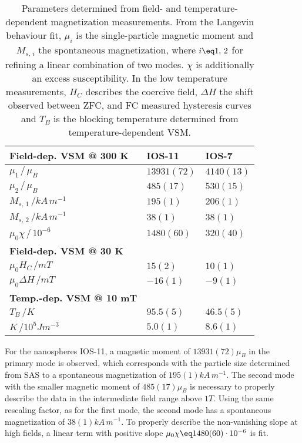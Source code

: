 \documentclass[\main/dresen_thesis.tex]{subfiles}
\begin{document}
  \begin{table}[!htbp]
    \centering
    \caption{\label{tab:looselyPackedNP:nanoparticle:vsm} Parameters determined from field- and temperature-dependent magnetization measurements. From the Langevin behaviour fit, $\mu_i$ is the single-particle magnetic moment and $M_{s,\,i}$ the spontaneous magnetization, where $i\eq 1,\,2$ for refining a linear combination of two modes. $\chi$ is additionally an excess susceptibility. In the low temperature measurements, $H_C$ describes the coercive field, $\Delta H$ the shift observed between ZFC, and FC measured hysteresis curves and $T_B$ is the blocking temperature determined from temperature-dependent VSM.}
    \begin{tabular}{ l | l | l }
      \rule{0pt}{2ex} \textbf{Field-dep. VSM @ 300 K} & IOS-11 & IOS-7 \\
      \hline
      \rule{0pt}{2ex} $\mu_1 \, / \, \mu_B$                     & $13931(72)$    & $4140(13)$\\
      \rule{0pt}{2ex} $\mu_2 \, / \, \mu_B$                     & $485(17) $     & $530(15)$\\
      \rule{0pt}{2ex} $M_{s,\,1} \, /  \unit{kA\,m^{-1}}$       & $195(1)$       & $206(1)$\\
      \rule{0pt}{2ex} $M_{s,\,2} \, /  \unit{kA\,m^{-1}}$       & $38(1)$        & $38(1)$\\
      \rule{0pt}{2ex} $\mu_0 \chi \, / \, 10^{-6}$              & $1480(60)$     & $320(40)$\\
      \hline
      \hline
      \rule{0pt}{2ex} \textbf{Field-dep. VSM @ 30 K} &  & \\
      \rule{0pt}{2ex} $\mu_0 H_C \, / \unit{mT}$                 & $15(2)$        & $10(1)$\\
      \rule{0pt}{2ex} $\mu_0 \Delta H \, / \unit{mT}$          & $-16(1)$       & $-9(1)$\\
      \hline
      \hline
      \rule{0pt}{2ex} \textbf{Temp.-dep. VSM @ 10 mT} &  & \\
      \rule{0pt}{2ex} $T_B \, / \unit{K}$                       & $95.5(5)$        & $46.5(5)$\\
      \rule{0pt}{2ex} $K \, / \unit{10^{5} J m^{-3}}$          & $5.0(1)$        & $8.6(1)$\\
    \end{tabular}
  \end{table}

  For the nanospheres IOS-11, a magnetic moment of $13931(72) \mu_B$ in the primary mode is observed, which corresponds with the particle size determined from SAS to a spontaneous magnetization of $195(1) \unit{kA\,m^{-1}}$.
  The second mode with the smaller magnetic moment of $485(17) \mu_B$ is necessary to properly describe the data in the intermediate field range above $1 \unit{T}$.
  Using the same rescaling factor, as for the first mode, the second mode has a spontaneous magnetization of $38(1) \unit{kA\,m^{-1}}$.
  To properly describe the non-vanishing slope at high fields, a linear term with positive slope $\mu_0 \chi \eq 1480(60) \cdot 10^{-6}$ is fit.
\end{document}
